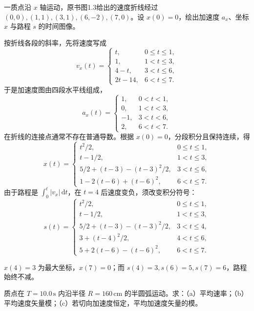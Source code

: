 一质点沿 $x$ 轴运动，原书图1.3给出的速度折线经过 $(0,0),(1,1),(3,1),(6,-2),(7,0)$。设 $x(0)=0$，绘出加速度 $a_x$、坐标 $x$ 与路程 $s$ 的时间图像。
\begin{center}
\end{center}

\exsolution
按折线各段的斜率，先将速度写成
\[
v_x(t)=\begin{cases}
t,&0\le t\le1,\\1,&1<t\le3,\\
4-t,&3<t\le6,\\2t-14,&6<t\le7.
\end{cases}
\]
于是加速度图由四段水平线组成，
\[
\boxed{a_x(t)=\begin{cases}
1,&0<t<1,\\0,&1<t<3,\\-1,&3<t<6,\\2,&6<t<7.
\end{cases}}
\]
在折线的连接点通常不存在普通导数。根据 $x(0)=0$，分段积分且保持连续，得
\[
\boxed{x(t)=\begin{cases}
t^2/2,&0\le t\le1,\\t-1/2,&1<t\le3,\\
5/2+(t-3)-(t-3)^2/2,&3<t\le6,\\
1-2(t-6)+(t-6)^2,&6<t\le7.
\end{cases}}
\]
由于路程是 $\int_0^t|v_x|\,\mathrm dt$，在 $t=4$ 后速度变负，须改变积分符号：
\[
\boxed{s(t)=\begin{cases}
t^2/2,&0\le t\le1,\\t-1/2,&1<t\le3,\\
5/2+(t-3)-(t-3)^2/2,&3<t\le4,\\
3+(t-4)^2/2,&4<t\le6,\\
5+2(t-6)-(t-6)^2,&6<t\le7.
\end{cases}}
\]

\excheck
$x(4)=3$ 为最大坐标，$x(7)=0$；而 $s(4)=3,s(6)=5,s(7)=6$，路程始终不减。


质点在 $T=10.0\,\mathrm s$ 内沿半径 $R=160\,\mathrm{cm}$ 的半圆弧运动。求：（a）平均速率；（b）平均速度矢量模；（c）若切向加速度恒定，平均加速度矢量的模。

